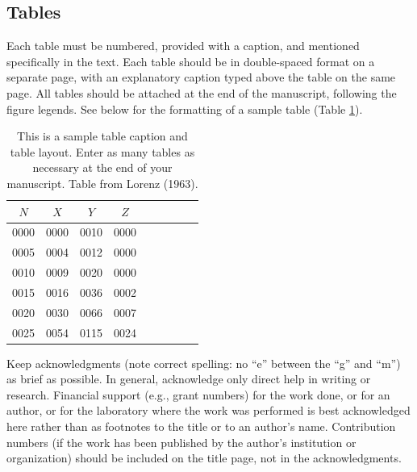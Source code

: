 \documentclass[12pt]{article}
\begin{document}
\subsection{Tables}
Each table must be numbered, provided with a caption, and mentioned specifically in the text. Each table should be in double-spaced format on a separate page, with an explanatory caption typed above the table on the same page. All tables should be attached at the end of the manuscript, following the figure legends. See below for the formatting of a sample table (Table \ref{t1}).
\begin{table}[t]
\caption{This is a sample table caption and table layout.  Enter as many tables as
  necessary at the end of your manuscript. Table from Lorenz (1963).}\label{t1}
\begin{center}
\begin{tabular}{ccccrrcrc}
\hline\hline
$N$ & $X$ & $Y$ & $Z$\\
\hline
 0000 & 0000 & 0010 & 0000 \\
 0005 & 0004 & 0012 & 0000 \\
 0010 & 0009 & 0020 & 0000 \\
 0015 & 0016 & 0036 & 0002 \\
 0020 & 0030 & 0066 & 0007 \\
 0025 & 0054 & 0115 & 0024 \\
\hline
\end{tabular}
\end{center}
\end{table}
%

\begin{acknowledgment}
Keep acknowledgments (note correct spelling: no ``e'' between the ``g'' and ``m'') as brief as possible. In general, acknowledge only direct help in writing or research. Financial support (e.g., grant numbers) for the work done, or for an author, or for the laboratory where the work was performed is best acknowledged here rather than as footnotes to the title or to an author's name. Contribution numbers (if the work has been published by the author's institution or organization) should be included on the title page, not in the acknowledgments.
\end{acknowledgment}
\end{document}
